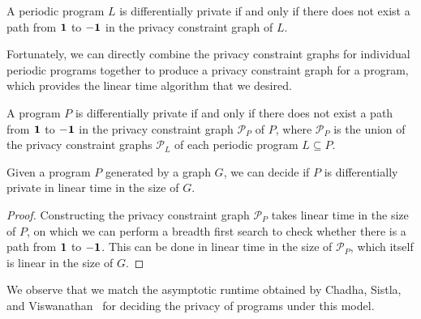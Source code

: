 \begin{prop}\label{privacyConstraintGraphProp}
    A periodic program $L$ is differentially private if and only if there does not exist a path from $\bf 1$ to $\bf -1$ in the privacy constraint graph of $L$.
\end{prop}

Fortunately, we can directly combine the privacy constraint graphs for individual periodic programs together to produce a privacy constraint graph for a program, which provides the linear time algorithm that we desired.

\begin{prop}\label{programPrivacyConstraintGraphPathReq}
    A program $P$ is differentially private if and only if there does not exist a path from $\bf 1$ to $\bf -1$ in the privacy constraint graph $\mathcal{P}_P$ of $P$, where $\mathcal{P}_P$ is the union of the privacy constraint graphs $\mathcal{P}_L$ of each periodic program $L\subseteq P$.
\end{prop}

\begin{thm}\label{LinearTimeDecidingPrograms}
    Given a program $P$ generated by a graph $G$, we can decide if $P$ is differentially private in linear time in the size of $G$.
\end{thm}

\begin{proof}
    Constructing the privacy constraint graph $\mathcal{P}_P$ takes linear time in the size of $P$, on which we can perform a breadth first search to check whether there is a path from $\bf 1$ to $\bf -1$. This can be done in linear time in the size of $\mathcal{P}_P$, which itself is linear in the size of $G$.
\end{proof}

We observe that we match the asymptotic runtime obtained by Chadha, Sistla, and Viswanathan~\cite{chadhaLinearTimeDecidability2021} for deciding the privacy of programs under this model. 


